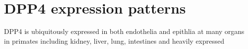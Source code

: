 \section{DPP4 expression patterns}
DPP4 is ubiquitously expressed in both endothelia and epithlia at many organs in primates including kidney, liver, lung, intestines and heavily expressed